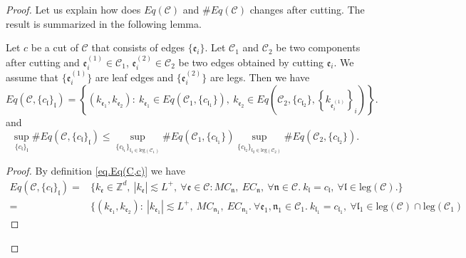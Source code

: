 \begin{proof}
Let us explain how does $Eq(\mathcal{C})$ and $\#Eq(\mathcal{C})$ changes after cutting. The result is summarized in the following lemma.
\begin{lem}\label{lem.Eq(C)cutting}
Let $c$ be a cut of $\mathcal{C}$ that consists of edges $\{\mathfrak{e}_{i}\}$. Let $\mathcal{C}_1$ and $\mathcal{C}_2$ be two components after cutting and $\mathfrak{e}_{i}^{(1)}\in \mathcal{C}_1$, $\mathfrak{e}_{i}^{(2)}\in \mathcal{C}_2$ be two edges obtained by cutting $\mathfrak{e}_{i}$. We assume that $\{\mathfrak{e}_{i}^{(1)}\}$ are leaf edges and $\{\mathfrak{e}_{i}^{(2)}\}$ are legs. Then we have 
\begin{equation}\label{eq.Eq(C)cutting}
    Eq(\mathcal{C},\{c_{\mathfrak{l}}\}_{\mathfrak{l}})=\left\{(k_{\mathfrak{e}_1},k_{\mathfrak{e}_{2}}):\ k_{\mathfrak{e}_1}\in Eq(\mathcal{C}_1,\{c_{\mathfrak{l}_1}\}),\  k_{\mathfrak{e}_{2}}\in Eq\left(\mathcal{C}_{2}, \{c_{\mathfrak{l}_2}\}, \left\{k_{\mathfrak{e}_{i}^{(1)}}\right\}_{i}\right)\right\}.
\end{equation}
and
\begin{equation}\label{eq.Eq(C)cuttingcounting}
    \sup_{\{c_{\mathfrak{l}}\}_{\mathfrak{l}}}\#Eq(\mathcal{C},\{c_{\mathfrak{l}}\}_{\mathfrak{l}})\le
    \sup_{\{c_{\mathfrak{l}_1}\}_{\mathfrak{l}_1\in \text{leg}(\mathcal{C}_1)} } \# Eq(\mathcal{C}_1,\{c_{\mathfrak{l}_1}\}) \sup_{\{c_{\mathfrak{l}_2}\}_{\mathfrak{l}_2\in \text{leg}(\mathcal{C}_2)} }\# Eq(\mathcal{C}_{2}, \{c_{\mathfrak{l}_2}\}).
\end{equation}
\end{lem}
\begin{proof}
By definition \eqref{eq.Eq(C,c)} we have
\begin{equation}
\begin{split}
    Eq(\mathcal{C},\{c_{\mathfrak{l}}\}_{\mathfrak{l}})=&\{k_{\mathfrak{e}}\in \mathbb{Z}^d,\ |k_{\mathfrak{e}}| \lesssim L^+,\ \forall \mathfrak{e}\in \mathcal{C}:MC_{\mathfrak{n}},\  EC_{\mathfrak{n}},\ \forall \mathfrak{n}\in \mathcal{C}.\ k_{\mathfrak{l}}=c_{\mathfrak{l}},\ \forall \mathfrak{l}\in \text{leg}(\mathcal{C}).\} \\
    =&\{(k_{\mathfrak{e}_1},k_{\mathfrak{e}_2}):\ |k_{\mathfrak{e}_1}| \lesssim L^+,\ MC_{\mathfrak{n}_1},\  EC_{\mathfrak{n}_1}.\ \forall \mathfrak{e}_1, \mathfrak{n}_1\in\mathcal{C}_1.\ k_{\mathfrak{l}_1}=c_{\mathfrak{l}_1},\ \forall \mathfrak{l}_1\in \text{leg}(\mathcal{C})\cap \text{leg}(\mathcal{C}_1)

\end{split}
\end{equation}
\end{proof}
\end{proof}
